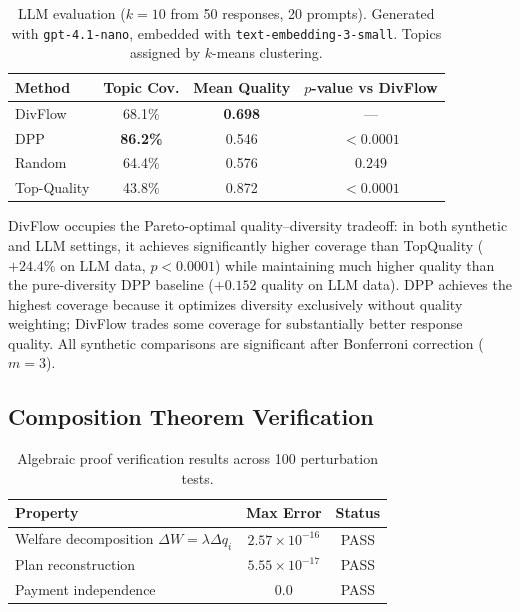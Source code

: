 \documentclass[10pt]{article}
\begin{document}
\begin{table}[t]
\centering
\caption{LLM evaluation ($k=10$ from 50 responses, 20 prompts). Generated with \texttt{gpt-4.1-nano}, embedded with \texttt{text-embedding-3-small}. Topics assigned by $k$-means clustering.}
\label{tab:llm}
\small
\begin{tabular}{lccc}
\toprule
\textbf{Method} & \textbf{Topic Cov.} & \textbf{Mean Quality} & \textbf{$p$-value vs DivFlow} \\
\midrule
DivFlow      & 68.1\% & \textbf{0.698} & --- \\
DPP          & \textbf{86.2\%} & 0.546 & $< 0.0001$ \\
Random       & 64.4\% & 0.576 & $0.249$ \\
Top-Quality  & 43.8\% & 0.872 & $< 0.0001$ \\
\bottomrule
\end{tabular}
\end{table}

DivFlow occupies the Pareto-optimal quality--diversity tradeoff: in both synthetic and LLM settings, it achieves significantly higher coverage than TopQuality ($+24.4\%$ on LLM data, $p < 0.0001$) while maintaining much higher quality than the pure-diversity DPP baseline ($+0.152$ quality on LLM data).
DPP achieves the highest coverage because it optimizes diversity exclusively without quality weighting; DivFlow trades some coverage for substantially better response quality.
All synthetic comparisons are significant after Bonferroni correction ($m=3$).

\subsection{Composition Theorem Verification}

\begin{table}[t]
\centering
\caption{Algebraic proof verification results across 100 perturbation tests.}
\label{tab:composition}
\begin{tabular}{lcc}
\toprule
\textbf{Property} & \textbf{Max Error} & \textbf{Status} \\
\midrule
Welfare decomposition $\Delta W = \lambda \Delta q_i$ & $2.57 \times 10^{-16}$ & PASS \\
Plan reconstruction & $5.55 \times 10^{-17}$ & PASS \\
Payment independence & $0.0$ & PASS \\
\bottomrule
\end{tabular}
\end{table}
\end{document}
